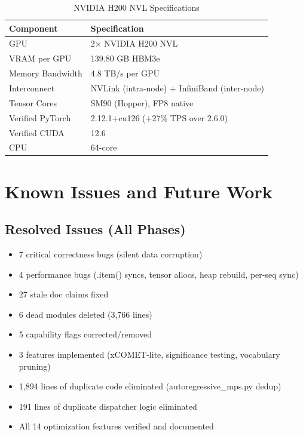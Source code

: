 \documentclass[11pt,a4paper,twoside]{article}
\begin{document}
\begin{table}[H]
\centering
\caption{NVIDIA H200 NVL Specifications}
\label{tab:h200}
\begin{tabular}{ll}
\toprule
\textbf{Component} & \textbf{Specification} \\
\midrule
GPU & 2$\times$ NVIDIA H200 NVL \\
VRAM per GPU & 139.80 GB HBM3e \\
Memory Bandwidth & 4.8 TB/s per GPU \\
Interconnect & NVLink (intra-node) + InfiniBand (inter-node) \\
Tensor Cores & SM90 (Hopper), FP8 native \\
Verified PyTorch & 2.12.1+cu126 (+27\% TPS over 2.6.0) \\
Verified CUDA & 12.6 \\
CPU & 64-core \\
\bottomrule
\end{tabular}
\end{table}

\section{Known Issues and Future Work}

\subsection{Resolved Issues (All Phases)}

\begin{itemize}[nosep]
  \item 7 critical correctness bugs (silent data corruption)
  \item 4 performance bugs (.item() syncs, tensor allocs, heap rebuild, per-seq sync)
  \item 27 stale doc claims fixed
  \item 6 dead modules deleted (3,766 lines)
  \item 5 capability flags corrected/removed
  \item 3 features implemented (xCOMET-lite, significance testing, vocabulary pruning)
  \item 1,894 lines of duplicate code eliminated (autoregressive\_mps.py dedup)
  \item 191 lines of duplicate dispatcher logic eliminated
  \item All 14 optimization features verified and documented
\end{itemize}
\end{document}
